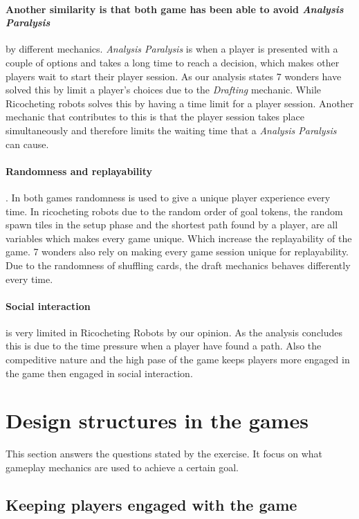 \documentclass[a4paper]{article}
\begin{document}
  \paragraph{Another similarity is that both game has been able to avoid \textit{Analysis Paralysis}} by different mechanics. \textit{Analysis Paralysis} is when a player is presented with a couple of options and takes a long time to reach a decision, which makes other players wait to start their player session. As our analysis states 7 wonders have solved this by limit a player's choices due to the \textit{Drafting} mechanic. While Ricocheting robots solves this by having a time limit for a player session. Another mechanic that contributes to this is that the player session takes place simultaneously and therefore limits the waiting time that a \textit{Analysis Paralysis} can cause.

  \paragraph{Randomness and replayability}. In both games randomness is used to give a unique player experience every time. In ricocheting robots due to the random order of goal tokens, the random spawn tiles in the setup phase and the shortest path found by a player, are all variables which makes every game unique. Which increase the replayability of the game. 7 wonders also rely on making every game session unique for replayability. Due to the randomness of shuffling cards, the draft mechanics behaves differently every time.

  \paragraph{Social interaction} is very limited in Ricocheting Robots by our opinion. As the analysis concludes this is due to the time pressure when a player have found a path. Also the compeditive nature and the high pase of the game keeps players more engaged in the game then engaged in social interaction. 

\section{Design structures in the games}
This section answers the questions stated by the exercise. It focus on what gameplay mechanics are used to achieve a certain goal. 

\subsection{Keeping players engaged with the game}
\end{document}
